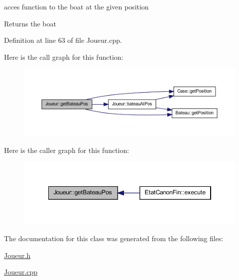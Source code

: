 acces function to the boat at the given position 

\begin{DoxyReturn}{Returns}
the boat 
\end{DoxyReturn}


Definition at line 63 of file Joueur.cpp.



Here is the call graph for this function:
\nopagebreak
\begin{figure}[H]
\begin{center}
\leavevmode
\includegraphics[width=400pt]{class_joueur_a744f60bbbf845f96cf9d57234be0eb7b_cgraph}
\end{center}
\end{figure}




Here is the caller graph for this function:
\nopagebreak
\begin{figure}[H]
\begin{center}
\leavevmode
\includegraphics[width=346pt]{class_joueur_a744f60bbbf845f96cf9d57234be0eb7b_icgraph}
\end{center}
\end{figure}




The documentation for this class was generated from the following files:\begin{DoxyCompactItemize}
\item 
\hyperlink{_joueur_8h}{Joueur.h}\item 
\hyperlink{_joueur_8cpp}{Joueur.cpp}\end{DoxyCompactItemize}
